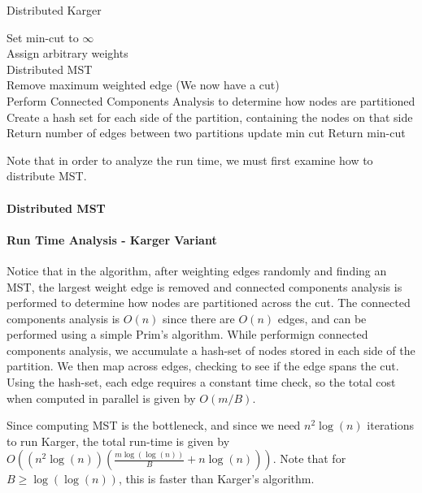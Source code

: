 \documentclass[12pt]{article}
\begin{document}
\LinesNumbered
\begin{algorithm}[H]
\caption{Distributed Karger}
Set min-cut to $\infty$ \\
 {
  Assign arbitrary weights \\
  Distributed MST \\
  Remove maximum weighted edge (We now have a cut) \\
  Perform Connected Components Analysis to determine how nodes are partitioned \\
  Create a hash set for each side of the partition, containing the nodes on that side \\
  \Reduce{} {
    Return number of edges between two partitions
  }
   {
    update min cut
  }
}
Return min-cut
\end{algorithm}

Note that in order to analyze the run time, we must first examine how to distribute MST.

\paragraph{Distributed MST}


\paragraph{Run Time Analysis - Karger Variant}

Notice that in the algorithm, after weighting edges randomly and finding an MST, the largest weight edge is removed and connected components analysis is performed to determine how nodes are partitioned across the cut. The connected components analysis is $O(n)$ since there are $O(n)$ edges, and can be performed using a simple Prim's algorithm. While performign connected components analysis, we accumulate a hash-set of nodes stored in each side of the partition. We then map across edges, checking to see if the edge spans the cut. Using the hash-set, each edge requires a constant time check, so the total cost when computed in parallel is given by $O(m/B)$.

Since computing MST is the bottleneck, and since we need $n^2 \log(n)$ iterations to run Karger, the total run-time is given by \\
$O((n^2 \log(n)) (\frac{m \log(\log(n))}{B} + n \log(n)))$. Note that for $B \geq \log(\log(n))$, this is faster than Karger's algorithm.
\end{document}
